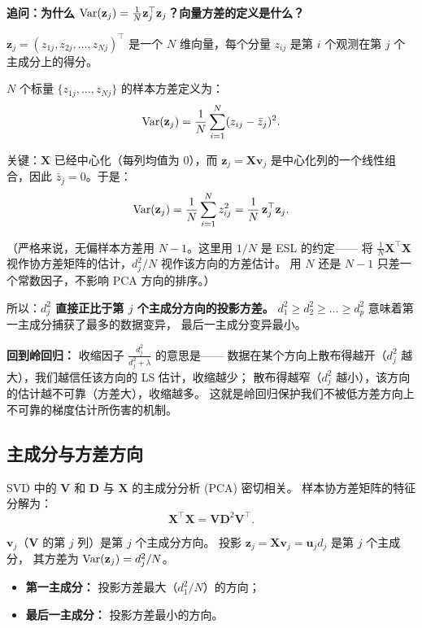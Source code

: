 \medskip
\noindent
\textbf{追问：为什么 $\mathrm{Var}(\mathbf{z}_j) = \frac{1}{N}\mathbf{z}_j^\top\mathbf{z}_j$？向量方差的定义是什么？}

$\mathbf{z}_j = (z_{1j}, z_{2j}, \dots, z_{Nj})^\top$ 是一个 $N$ 维向量，每个分量 $z_{ij}$ 是第 $i$ 个观测在第 $j$ 个主成分上的得分。

$N$ 个标量 $\{z_{1j}, \dots, z_{Nj}\}$ 的样本方差定义为：
\[
    \mathrm{Var}(\mathbf{z}_j) = \frac{1}{N} \sum_{i=1}^{N} (z_{ij} - \bar{z}_j)^2.
\]

关键：$\mathbf{X}$ 已经中心化（每列均值为 0），而 $\mathbf{z}_j = \mathbf{X}\mathbf{v}_j$ 是中心化列的一个线性组合，因此 $\bar{z}_j = 0$。于是：
\[
    \mathrm{Var}(\mathbf{z}_j) = \frac{1}{N} \sum_{i=1}^{N} z_{ij}^2
    = \frac{1}{N}\, \mathbf{z}_j^\top \mathbf{z}_j.
\]

（严格来说，无偏样本方差用 $N-1$。这里用 $1/N$ 是 ESL 的约定——
将 $\frac{1}{N}\mathbf{X}^\top\mathbf{X}$ 视作协方差矩阵的估计，$d_j^2/N$ 视作该方向的方差估计。
用 $N$ 还是 $N-1$ 只差一个常数因子，不影响 PCA 方向的排序。）

所以：\textbf{$d_j^2$ 直接正比于第 $j$ 个主成分方向的投影方差。}
$d_1^2 \ge d_2^2 \ge \dots \ge d_p^2$ 意味着第一主成分捕获了最多的数据变异，
最后一主成分变异最小。

\textbf{回到岭回归：} 收缩因子 $\frac{d_j^2}{d_j^2 + \lambda}$ 的意思是——
数据在某个方向上散布得越开（$d_j^2$ 越大），我们越信任该方向的 LS 估计，收缩越少；
散布得越窄（$d_j^2$ 越小），该方向的估计越不可靠（方差大），收缩越多。
这就是岭回归保护我们不被低方差方向上不可靠的梯度估计所伤害的机制。

\subsection{主成分与方差方向}

SVD 中的 $\mathbf{V}$ 和 $\mathbf{D}$ 与 $\mathbf{X}$ 的主成分分析 (PCA) 密切相关。
样本协方差矩阵的特征分解为：
\begin{equation}\label{eq:pca}
    \mathbf{X}^\top \mathbf{X} = \mathbf{V} \mathbf{D}^2 \mathbf{V}^\top.
\end{equation}

$\mathbf{v}_j$（$\mathbf{V}$ 的第 $j$ 列）是第 $j$ 个主成分方向。
投影 $\mathbf{z}_j = \mathbf{X}\mathbf{v}_j = \mathbf{u}_j d_j$ 是第 $j$ 个主成分，
其方差为 $\mathrm{Var}(\mathbf{z}_j) = d_j^2 / N$。

\begin{itemize}
    \item \textbf{第一主成分：} 投影方差最大（$d_1^2/N$）的方向；
    \item \textbf{最后一主成分：} 投影方差最小的方向。
\end{itemize}


